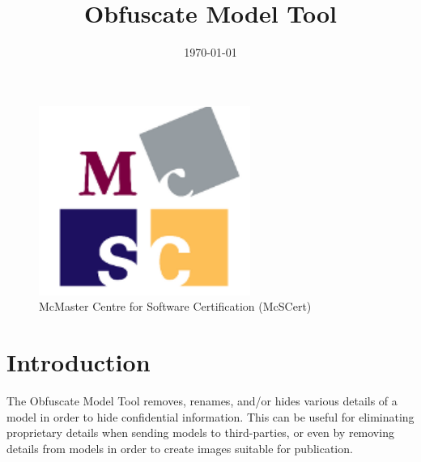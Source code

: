 \documentclass{article}
\makeatletter
\newcommand{\ToolName}{Obfuscate Model Tool\@\xspace}
\makeatother
\begin{document}
\title{\ToolName}
\date{\monthyeardate\today}
\maketitle
\vfill

\begin{figure}
	\centering
	\includegraphics[]{../figs/McSCert_Logo.pdf} \\
	McMaster Centre for Software Certification (McSCert)
\end{figure}

\newpage


\tableofcontents
\newpage

\section{Introduction}

The \ToolName removes, renames, and/or hides various details of a \Simulink model in order to hide confidential information.
This can be useful for eliminating proprietary details when sending models to third-parties, or even by removing details from models in order to create images suitable for publication.

%
	
\end{document}
